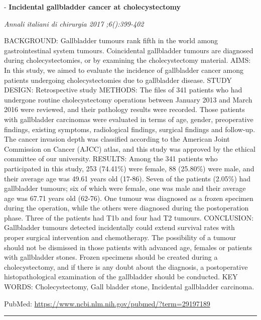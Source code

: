\documentclass[]{article}
\begin{document}
 - \textbf{Incidental gallbladder cancer at cholecystectomy}

\emph{Annali italiani di chirurgia 2017 ;6():399-402}

BACKGROUND: Gallbladder tumours rank fifth in the world among
gastrointestinal system tumours. Coincidental gallbladder tumours are
diagnosed during cholecystectomies, or by examining the cholecystectomy
material. AIMS: In this study, we aimed to evaluate the incidence of
gallbladder cancer among patients undergoing cholecystectomies due to
gallbladder disease. STUDY DESIGN: Retrospective study METHODS: The
files of 341 patients who had undergone routine cholecystectomy
operations between January 2013 and March 2016 were reviewed, and their
pathology results were recorded. Those patients with gallbladder
carcinomas were evaluated in terms of age, gender, preoperative
findings, existing symptoms, radiological findings, surgical findings
and follow-up. The cancer invasion depth was classified according to the
American Joint Commission on Cancer (AJCC) atlas, and this study was
approved by the ethical committee of our university. RESULTS: Among the
341 patients who participated in this study, 253 (74.41\%) were female,
88 (25.80\%) were male, and their average age was 49.61 years old
(17-86). Seven of the patients (2.05\%) had gallbladder tumours; six of
which were female, one was male and their average age was 67.71 years
old (62-76). One tumour was diagnosed as a frozen specimen during the
operation, while the others were diagnosed during the postoperation
phase. Three of the patients had T1b and four had T2 tumours.
CONCLUSION: Gallbladder tumours detected incidentally could extend
survival rates with proper surgical intervention and chemotherapy. The
possibility of a tumour should not be dismissed in those patients with
advanced age, females or patients with gallbladder stones. Frozen
specimens should be created during a cholecystectomy, and if there is
any doubt about the diagnosis, a postoperative histopathological
examination of the gallbladder should be conducted. KEY WORDS:
Cholecystectomy, Gall bladder stone, Incidental gallbladder carcinoma.

PubMed: \url{https://www.ncbi.nlm.nih.gov/pubmed/?term=29197189}

{}

{}

\begin{center}\rule{0.5\linewidth}{\linethickness}\end{center}
\end{document}
